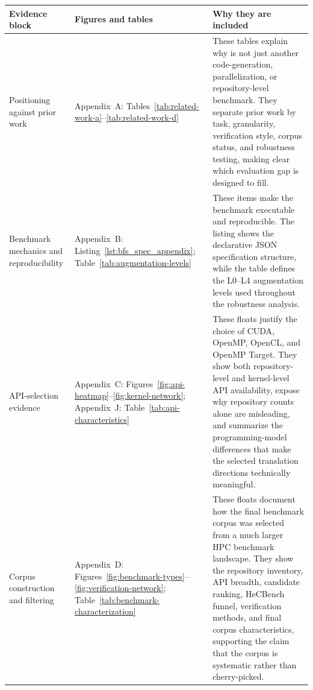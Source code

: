 \vspace{0.5em}

\begin{center}
\tiny
\renewcommand{\arraystretch}{1.18}
\setlength{\tabcolsep}{3pt}

\begin{tabularx}{0.98\textwidth}{@{}
>{\RaggedRight\arraybackslash}p{}
>{\RaggedRight\arraybackslash}p{}
X
@{}} 
\toprule
\textbf{Evidence block} & \textbf{Figures and tables} & \textbf{Why they are included} \\
\midrule

Positioning against prior work
&
Appendix~A:
Tables~\ref{tab:related-work-a}--\ref{tab:related-work-d}
&
These tables explain why \parbench{} is not just another code-generation,
parallelization, or repository-level benchmark. They separate prior work by task,
granularity, verification style, corpus status, and robustness testing, making clear
which evaluation gap \parbench{} is designed to fill. \\

Benchmark mechanics and reproducibility
&
Appendix~B:
Listing~\ref{lst:bfs_spec_appendix};
Table~\ref{tab:augmentation-levels}
&
These items make the benchmark executable and reproducible. The listing shows the
declarative JSON specification structure, while the table defines the L0--L4
augmentation levels used throughout the robustness analysis. \\

API-selection evidence
&
Appendix~C:
Figures~\ref{fig:api-heatmap}--\ref{fig:kernel-network};
Appendix~J:
Table~\ref{tab:api-characteristics}
&
These floats justify the choice of CUDA, OpenMP, OpenCL, and OpenMP Target. They
show both repository-level and kernel-level API availability, expose why repository
counts alone are misleading, and summarize the programming-model differences that
make the selected translation directions technically meaningful. \\

Corpus construction and filtering
&
Appendix~D:
Figures~\ref{fig:benchmark-types}--\ref{fig:verification-network};
Table~\ref{tab:benchmark-characterization}
&
These floats document how the final benchmark corpus was selected from a much larger
HPC benchmark landscape. They show the repository inventory, API breadth, candidate
ranking, HeCBench funnel, verification methods, and final corpus characteristics,
supporting the claim that the corpus is systematic rather than cherry-picked. \\


\end{tabularx}
\end{center}
